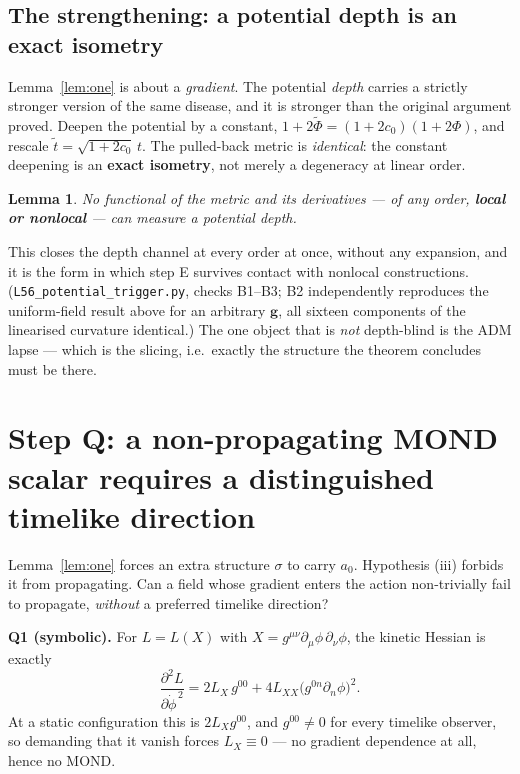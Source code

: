 \documentclass[11pt,letterpaper]{article}
\newtheorem{lemma}{Lemma}
\begin{document}
\subsection{The strengthening: a potential depth is an exact isometry}\label{sec:L56}
Lemma~\ref{lem:one} is about a \emph{gradient}. The potential \emph{depth} carries a strictly stronger version of the same disease, and it is stronger than the original argument proved. Deepen the potential by a constant, $1+2\tilde\Phi=(1+2c_0)(1+2\Phi)$, and rescale $\tilde t=\sqrt{1+2c_0}\,t$. The pulled-back metric is \emph{identical}: the constant deepening is an \textbf{exact isometry}, not merely a degeneracy at linear order.

\begin{lemma}\label{lem:depth}
No functional of the metric and its derivatives --- of any order, \textbf{local or nonlocal} --- can measure a potential depth.
\end{lemma}
This closes the depth channel at every order at once, without any expansion, and it is the form in which step E survives contact with nonlocal constructions. (\texttt{L56\_potential\_trigger.py}, checks B1--B3; B2 independently reproduces the uniform-field result above for an arbitrary $\mathbf{g}$, all sixteen components of the linearised curvature identical.) The one object that is \emph{not} depth-blind is the ADM lapse --- which is the slicing, i.e.\ exactly the structure the theorem concludes must be there.

\section{Step Q: a non-propagating MOND scalar requires a distinguished timelike direction}\label{sec:Q}

Lemma~\ref{lem:one} forces an extra structure $\sigma$ to carry $a_0$. Hypothesis (iii) forbids it from propagating. Can a field whose gradient enters the action non-trivially fail to propagate, \emph{without} a preferred timelike direction?

\textbf{Q1 (symbolic).} For $L=L(X)$ with $X=g^{\mu\nu}\partial_\mu\phi\,\partial_\nu\phi$, the kinetic Hessian is exactly
\begin{equation}
\frac{\partial^2L}{\partial\dot\phi^{\,2}}=2L_X\,g^{00}+4L_{XX}\big(g^{0n}\partial_n\phi\big)^2 .
\end{equation}
At a static configuration this is $2L_Xg^{00}$, and $g^{00}\ne0$ for every timelike observer, so demanding that it vanish forces $L_X\equiv0$ --- no gradient dependence at all, hence no MOND.
\end{document}
